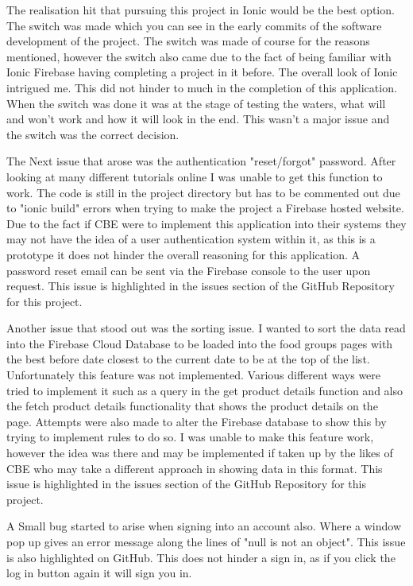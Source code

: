 The realisation hit that pursuing this project in Ionic would be the best option. The switch was made which you can see in the early commits of the software development of the project. The switch was made of course for the reasons mentioned, however the switch also came due to the fact of being familiar with Ionic Firebase having completing a project in it before. The overall look of Ionic intrigued me. This did not hinder to much in the completion of this application. When the switch was done it was at the stage of testing the waters, what will and won't work and how it will look in the end. This wasn't a major issue and the switch was the correct decision. 
\newline

The Next issue that arose was the authentication "reset/forgot" password. After looking at many different tutorials online I was unable to get this function to work. The code is still in the project directory but has to be commented out due to "ionic build" errors when trying to make the project a Firebase hosted website. Due to the fact if CBE were to implement this application into their systems they may not have the idea of a user authentication system within it, as this is a prototype it does not hinder the overall reasoning for this application. A password reset email can be sent via the Firebase console to the user upon request. This issue is highlighted in the issues section of the GitHub Repository for this project.
\newline

Another issue that stood out was the sorting issue. I wanted to sort the data read into the Firebase Cloud Database to be loaded into the food groups pages with the best before date closest to the current date to be at the top of the list. Unfortunately this feature was not implemented. Various different ways were tried to implement it such as a query in the get product details function and also the fetch product details functionality that shows the product details on the page. Attempts were also made to alter the Firebase database to show this by trying to implement rules to do so. I was unable to make this feature work, however the idea was there and may be implemented if taken up by the likes of CBE who may take a different approach in showing data in this format. This issue is highlighted in the issues section of the GitHub Repository for this project.
\newline

A Small bug started to arise when signing into an account also. Where a window pop up gives an error message along the lines of "null is not an object". This issue is also highlighted on GitHub. This does not hinder a sign in, as if you click the log in button again it will sign you in.
\newline

